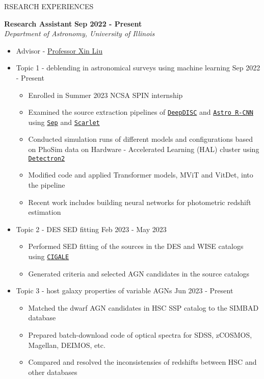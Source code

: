 \documentclass[11pt]{article}
\begin{document}
\begin{section}{RSEARCH EXPERIENCES}

\textbf{Research Assistant} \hfill \textbf{Sep 2022 - Present} \\
\textit{Department of Astronomy, University of Illinois} 
\begin{itemize}[leftmargin=1.5em]
    \item Advisor - \href{mailto:xinliuxl@illinois.edu}{Professor Xin Liu}
    \item Topic 1 - deblending in astronomical surveys using machine learning \hfill Sep 2022 - Present
    \begin{itemize}[leftmargin=1.5em]
        \item Enrolled in Summer 2023 NCSA SPIN internship
        \item Examined the source extraction pipelines of \href{https://github.com/burke86/deepdisc}{\texttt{DeepDISC}} and \href{https://github.com/burke86/astro_rcnn}{\texttt{Astro R-CNN}} using \href{https://github.com/kbarbary/sep/tree/v1.1.x}{\texttt{Sep}} and \href{https://github.com/pmelchior/scarlet}{\texttt{Scarlet}}
        \item Conducted simulation runs of different models and configurations based on PhoSim data on Hardware - Accelerated Learning (HAL) cluster using \href{https://github.com/facebookresearch/detectron2}{\texttt{Detectron2}}
        \item Modified code and applied Transformer models, MViT and VitDet, into the pipeline
        \item Recent work includes building neural networks for photometric redshift estimation 
    \end{itemize}
    \item Topic 2 - DES SED fitting \hfill Feb 2023 - May 2023
    \begin{itemize}[leftmargin=1.5em]
        \item Performed SED fitting of the sources in the DES and WISE catalogs using \href{https://cigale.lam.fr/}{\texttt{CIGALE}} 
        \item Generated criteria and selected AGN candidates in the source catalogs
    \end{itemize}
    \item Topic 3 - host galaxy properties of variable AGNs \hfill Jun 2023 - Present
    \begin{itemize}[leftmargin=1.5em]
        \item Matched the dwarf AGN candidates in HSC SSP catalog to the SIMBAD database 
        \item Prepared batch-download code of optical spectra for SDSS, zCOSMOS, Magellan, DEIMOS, etc. 
        \item Compared and resolved the inconsistensies of redshifts between HSC and other databases
    \end{itemize}
\end{itemize}


\end{section}
\end{document}
